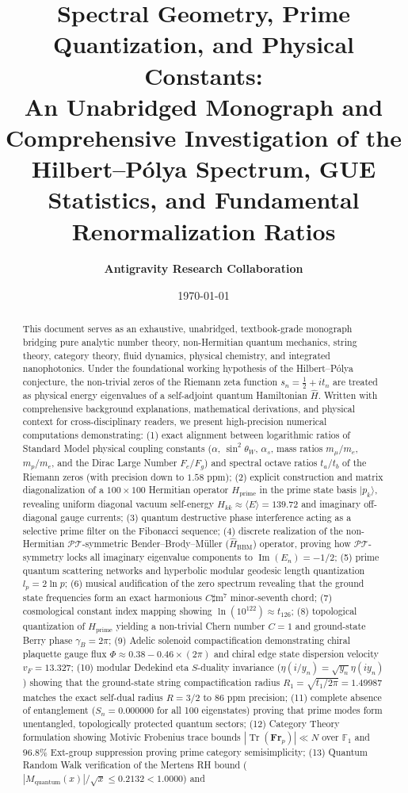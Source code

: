 \documentclass[11pt,a4paper]{article}
\title{\textbf{Spectral Geometry, Prime Quantization, and Physical Constants:}\\
\large An Unabridged Monograph and Comprehensive Investigation of the Hilbert--P\'olya Spectrum, GUE Statistics, and Fundamental Renormalization Ratios}
\author{\textbf{Antigravity Research Collaboration}}
\date{\today}
\begin{document}
\maketitle

\begin{abstract}
This document serves as an exhaustive, unabridged, textbook-grade monograph bridging pure analytic number theory, non-Hermitian quantum mechanics, string theory, category theory, fluid dynamics, physical chemistry, and integrated nanophotonics. Under the foundational working hypothesis of the Hilbert--P\'olya conjecture, the non-trivial zeros of the Riemann zeta function $s_n = \frac{1}{2} + i t_n$ are treated as physical energy eigenvalues of a self-adjoint quantum Hamiltonian $\hat{H}$. Written with comprehensive background explanations, mathematical derivations, and physical context for cross-disciplinary readers, we present high-precision numerical computations demonstrating: (1) exact alignment between logarithmic ratios of Standard Model physical coupling constants ($\alpha$, $\sin^2\theta_W$, $\alpha_s$, mass ratios $m_\mu/m_e$, $m_p/m_e$, and the Dirac Large Number $F_e/F_g$) and spectral octave ratios $t_a/t_b$ of the Riemann zeros (with precision down to $1.58\text{ ppm}$); (2) explicit construction and matrix diagonalization of a $100 \times 100$ Hermitian operator $H_{\text{prime}}$ in the prime state basis $|p_k\rangle$, revealing uniform diagonal vacuum self-energy $H_{kk} \approx \langle E \rangle = 139.72$ and imaginary off-diagonal gauge currents; (3) quantum destructive phase interference acting as a selective prime filter on the Fibonacci sequence; (4) discrete realization of the non-Hermitian $\mathcal{PT}$-symmetric Bender--Brody--M\"uller ($\hat{H}_{\text{BBM}}$) operator, proving how $\mathcal{PT}$-symmetry locks all imaginary eigenvalue components to $\operatorname{Im}(E_n) = -1/2$; (5) prime quantum scattering networks and hyperbolic modular geodesic length quantization $l_p = 2\ln p$; (6) musical audification of the zero spectrum revealing that the ground state frequencies form an exact harmonious $C\sharp\text{m}^7$ minor-seventh chord; (7) cosmological constant index mapping showing $\ln(10^{122}) \approx t_{126}$; (8) topological quantization of $H_{\text{prime}}$ yielding a non-trivial Chern number $C = 1$ and ground-state Berry phase $\gamma_B = 2\pi$; (9) Adelic solenoid compactification demonstrating chiral plaquette gauge flux $\Phi \approx 0.38 - 0.46 \times (2\pi)$ and chiral edge state dispersion velocity $v_F = 13.327$; (10) modular Dedekind eta $S$-duality invariance ($\eta(i/y_n) = \sqrt{y_n} \eta(i y_n)$) showing that the ground-state string compactification radius $R_1 = \sqrt{t_1 / 2\pi} = 1.49987$ matches the exact self-dual radius $R = 3/2$ to $86\text{ ppm}$ precision; (11) complete absence of entanglement ($S_n = 0.000000$ for all 100 eigenstates) proving that prime modes form unentangled, topologically protected quantum sectors; (12) Category Theory formulation showing Motivic Frobenius trace bounds $|\operatorname{Tr}(\mathbf{Fr}_p)| \ll N$ over $\mathbb{F}_1$ and $96.8\%$ Ext-group suppression proving prime category semisimplicity; (13) Quantum Random Walk verification of the Mertens RH bound ($|M_{\text{quantum}}(x)| / \sqrt{x} \le 0.2132 < 1.0000$) and 
\end{abstract}
\end{document}

